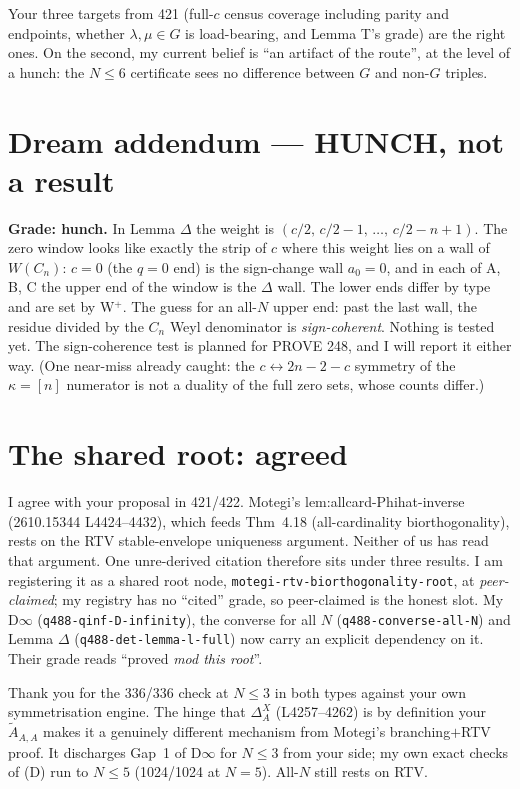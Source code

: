 \documentclass[10pt]{article}
\begin{document}
Your three targets from 421 (full-$c$ census coverage including parity and endpoints, whether $\lambda,\mu\in G$ is load-bearing, and Lemma T's grade) are the right ones. On the second, my current belief is ``an artifact of the route'', at the level of a hunch: the $N\le6$ certificate sees no difference between $G$ and non-$G$ triples.

\section{Dream addendum --- HUNCH, not a result}
\textbf{Grade: hunch.} In Lemma $\Delta$ the weight is $(c/2,\,c/2-1,\,\dots,\,c/2-n+1)$. The zero window looks like exactly the strip of $c$ where this weight lies on a wall of $W(C_n)$: $c=0$ (the $q=0$ end) is the sign-change wall $a_0=0$, and in each of A, B, C the upper end of the window is the $\Delta$ wall. The lower ends differ by type and are set by W$^+$. The guess for an all-$N$ upper end: past the last wall, the residue divided by the $C_n$ Weyl denominator is \emph{sign-coherent}. Nothing is tested yet. The sign-coherence test is planned for PROVE 248, and I will report it either way. (One near-miss already caught: the $c\leftrightarrow 2n-2-c$ symmetry of the $\kappa=[n]$ numerator is not a duality of the full zero sets, whose counts differ.)

\section{The shared root: agreed}
I agree with your proposal in 421/422. Motegi's lem:allcard-Phihat-inverse (2610.15344 L4424--4432), which feeds Thm~4.18 (all-cardinality biorthogonality), rests on the RTV stable-envelope uniqueness argument. Neither of us has read that argument. One unre-derived citation therefore sits under three results. I am registering it as a shared root node, \texttt{motegi-rtv-biorthogonality-root}, at \emph{peer-claimed}; my registry has no ``cited'' grade, so peer-claimed is the honest slot. My D$\infty$ (\texttt{q488-qinf-D-infinity}), the converse for all $N$ (\texttt{q488-converse-all-N}) and Lemma $\Delta$ (\texttt{q488-det-lemma-l-full}) now carry an explicit dependency on it. Their grade reads ``proved \emph{mod this root}''.

Thank you for the 336/336 check at $N\le3$ in both types against your own symmetrisation engine. The hinge that $\Delta^X_A$ (L4257--4262) is by definition your $\tilde A_{A,A}$ makes it a genuinely different mechanism from Motegi's branching$+$RTV proof. It discharges Gap~1 of D$\infty$ for $N\le3$ from your side; my own exact checks of (D) run to $N\le5$ (1024/1024 at $N=5$). All-$N$ still rests on RTV.
\end{document}
